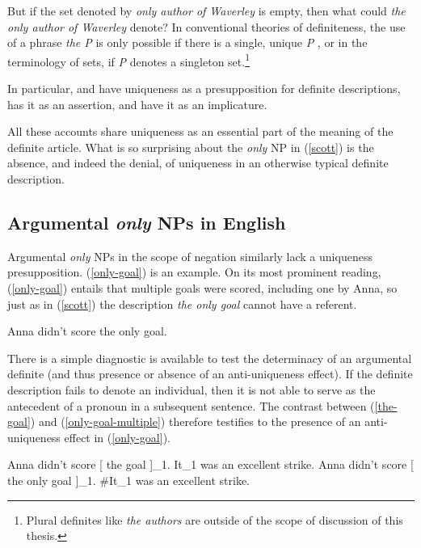 But if the set denoted by \textit{only author of Waverley} is empty, then what could \textit{the only author of Waverley} denote? In conventional theories of definiteness, the use of a phrase \textit{the P} is only possible if there is a single, unique \textit{P} \citep{horn-abbott-2012}, or in the terminology of sets, if \textit{P} denotes a singleton set.\footnote{Plural definites like \textit{the authors} are outside of the scope of discussion of this thesis.}

In particular, \citet{frege} and \citet{strawson50} have uniqueness as a presupposition for definite descriptions, \citet{russell} has it as an assertion, and \citet{horn-abbott-2012} have it as an implicature.

All these accounts share uniqueness as an essential part of the meaning of the definite article. What is so surprising about the \textit{only} NP in (\ref{scott}) is the absence, and indeed the denial, of uniqueness in an otherwise typical definite description.

\subsection{Argumental \textit{only} NPs in English}
Argumental \textit{only} NPs in the scope of negation similarly lack a uniqueness presupposition. (\ref{only-goal}) is an example. On its most prominent reading, (\ref{only-goal}) entails that multiple goals were scored, including one by Anna, so just as in (\ref{scott}) the description \textit{the only goal} cannot have a referent.

\begin{exe}
	\ex \label{only-goal} Anna didn't score the only goal.
\end{exe}

There is a simple diagnostic is available to test the determinacy of an argumental definite (and thus presence or absence of an anti-uniqueness effect). If the definite description fails to denote an individual, then it is not able to serve as the antecedent of a pronoun in a subsequent sentence. The contrast between (\ref{the-goal}) and (\ref{only-goal-multiple}) therefore testifies to the presence of an anti-uniqueness effect in (\ref{only-goal}).

\begin{exe}
	\ex \label{the-goal} Anna didn't score [ the goal ]_1. It_1 was an excellent strike.
	\ex \label{only-goal-multiple} Anna didn't score [ the only goal ]_1. \#It_1 was an excellent strike.
\end{exe}

